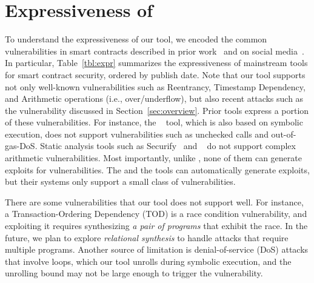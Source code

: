 \section{Expressiveness of \toolname}\label{sec:express}
To understand the expressiveness of our tool, we encoded the common vulnerabilities in 
smart contracts described in prior work~\cite{attack-time,smart-sec} and on social 
media~\cite{batch-news}. 
In particular, Table~\ref{tbl:expr} summarizes the expressiveness of mainstream tools
for smart contract security, ordered by publish date. Note that our tool  
 supports not only well-known vulnerabilities such as Reentrancy, Timestamp Dependency,
 and Arithmetic operations (i.e., over/underflow), but also recent attacks
 such as the \batchoverflow vulnerability discussed 
 in Section~\ref{sec:overview}. Prior tools express 
 a portion of these vulnerabilities. For instance, the \oyente~\cite{oyente} 
 tool, which is also based on symbolic execution, does not support vulnerabilities such as 
 unchecked calls and out-of-gas-DoS. Static analysis tools such as 
 Securify~\cite{securify} and \madmax~\cite{madmax} do not support complex arithmetic vulnerabilities.
Most importantly, unlike \toolname, 
 none of them can generate exploits for vulnerabilities. The \teether and the 
 \contractfuzz tools can automatically generate 
 exploits, but their systems only support a small class of vulnerabilities.

 There are some vulnerabilities that our tool does not support well. 
 For instance, a Transaction-Ordering Dependency (TOD) is a race condition 
 vulnerability, and exploiting it requires synthesizing \emph{a pair of programs}
 that exhibit the race. In the future, we plan to explore \emph{relational synthesis}
 to handle attacks that require multiple programs. Another source of limitation
 is denial-of-service (DoS) attacks that involve loops, which our tool unrolls during 
 symbolic execution, and the unrolling bound may not be large enough to
 trigger the vulnerability.


